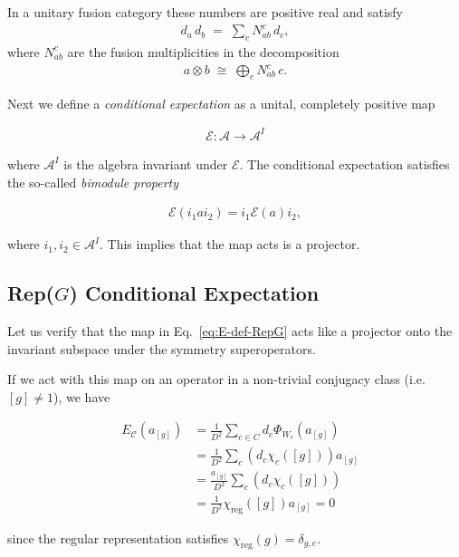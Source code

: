 \documentclass{article}
\newcommand{\mA}{\mathcal{A}}
\newcommand{\mC}{\mathcal{C}}
\theoremstyle{definition}
\begin{document}
  In a unitary fusion category these numbers are positive real and satisfy
  \begin{eqnarray}
    d_a\, d_b \;=\; \sum_{c} N_{ab}^c\, d_c,
  \end{eqnarray}
  where $N_{ab}^{c}$ are the fusion multiplicities in the decomposition
  \begin{eqnarray}
    a\otimes b \;\cong\; \bigoplus_{c} N_{ab}^c\, c.
  \end{eqnarray}

  Next we define a \textit{conditional expectation} as a unital, completely positive
  map

  \begin{eqnarray}
    \mathcal{E}: \mA \rightarrow \mA^I
  \end{eqnarray}

  where $\mA^{I}$ is the algebra invariant under $\mathcal{E}$. The conditional
  expectation satisfies the so-called \textit{bimodule property}

  \begin{eqnarray}
    \mathcal{E}(i_{1}ai_2) = i_1\mathcal{E}(a)i_2,
  \end{eqnarray}

  where $i_{1}, i_{2}\in \mA^{I}$. This implies that the map acts is a projector.

  \subsection{Rep($G$) Conditional Expectation}
  \label{sec:condexprepg}

  Let us verify that the map in Eq.~\ref{eq:E-def-RepG} acts like a projector
  onto the invariant subspace under the symmetry superoperators.

  If we act with this map on an operator in a non-trivial conjugacy class (i.e.
  $[ g]\neq 1$), we have

  \begin{eqnarray}
    &E_{\mC}(a_{[g]})&=\frac{1}{D^{2}}\sum_{c\in C}d_c\Phi_{W_c}(a_{[g]})\\
    &&= \frac{1}{D^{2}}\sum_c (d_c \chi_c([g])) a_{[g]}\\
    &&= \frac{a_{[g]}}{D^{2}}\sum_c (d_c \chi_c([g])) \\
    &&=\frac{1}{D^{2}}\chi_\text{reg}([g])a_{[g]} = 0
  \end{eqnarray}

  since the regular representation satisfies
  $\chi_{\text{reg}}(g)= \delta_{g,e}$.
\end{document}

